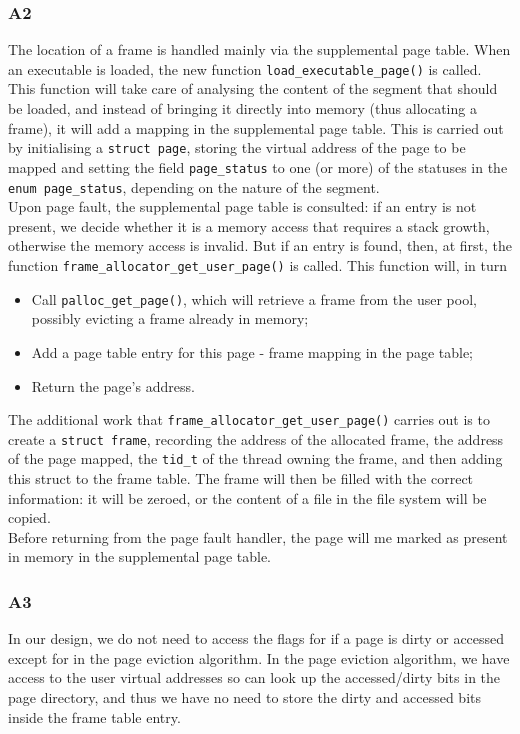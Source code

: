 \documentclass[a4wide, 11pt]{article}
\newcommand{\tx}{\texttt}
\begin{document}
\subsubsection{A2}
The location of a frame is handled mainly via the supplemental page table.
When an executable is loaded, the new function \tx{load\_executable\_page()} is called. This function will take care of analysing the content of the segment that should be loaded, and instead of bringing it directly into memory (thus allocating a frame), it will add a mapping in the supplemental page table. This is carried out by initialising a \tx{struct page}, storing the virtual address of the page to be mapped and setting the field \tx{page\_status} to one (or more) of the statuses in the \tx{enum page\_status}, depending on the nature of the segment. \\
Upon page fault, the supplemental page table is consulted: if an entry is not present, we decide whether it is a memory access that requires a stack growth, otherwise the memory access is invalid. But if an entry is found, then, at first, the function \tx{frame\_allocator\_get\_user\_page()} is called. This function will, in turn
\begin{itemize}
\item Call \tx{palloc\_get\_page()}, which will retrieve a frame from the user pool, possibly evicting a frame already in memory;
\item Add a page table entry for this page - frame mapping in the page table;
\item Return the page's address.
\end{itemize}
The additional work that \tx{frame\_allocator\_get\_user\_page()} carries out is to create a \tx{struct frame}, recording the address of the allocated frame, the address of the page  mapped, the \tx{tid\_t} of the thread owning the frame, and then adding this struct to the frame table. The frame will then be filled with the correct information: it will be zeroed, or the content of a file in the file system will be copied. \\
Before returning from the page fault handler, the page will me marked as present in memory in the supplemental page table.

\subsubsection{A3}

In our design, we do not need to access the flags for if a page is dirty or accessed except for in the page eviction algorithm. In the page eviction algorithm, we have access to the user virtual addresses so can look up the accessed/dirty bits in the page directory, and thus we have no need to store the dirty and accessed bits inside the frame table entry.
\end{document}
